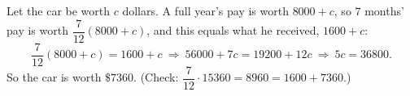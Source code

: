 Let the car be worth $c$ dollars. A full year's pay is worth $8000+c$, so $7$ months' pay is worth $\dfrac{7}{12}(8000+c)$, and this equals what he received, $1600+c$:
\[
\dfrac{7}{12}(8000+c)=1600+c\ \Longrightarrow\ 56000+7c=19200+12c\ \Longrightarrow\ 5c=36800 .
\]
So the car is worth $\boxed{\$7360}$. (Check: $\dfrac{7}{12}\cdot15360=8960=1600+7360$.)
